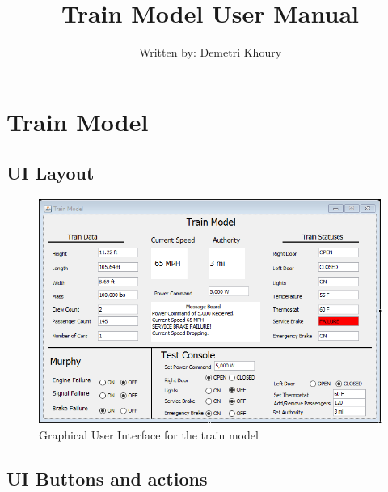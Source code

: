 \documentclass[letterpaper]{article}
\begin{document}
\newpage

\begin{center}
	\Large
	\title{Train Model User Manual \\}
	\author{Written by: Demetri Khoury}
	\date{}	
\end{center}

\maketitle


\section{Train Model}

\subsection{UI Layout}

\begin{figure} [h!]
	\center
	\includegraphics[width=16cm]{trainmodel_gui}
	\caption{Graphical User Interface for the train model}
\end{figure}


\subsection{UI Buttons and actions}
\end{document}

